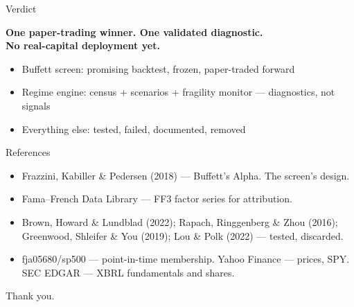 \documentclass[10pt]{beamer}
\begin{document}
\begin{frame}{Verdict}
\begin{center}
\Large\bfseries\color{nmblue} One paper-trading winner. One validated diagnostic.\\ No real-capital deployment yet.
\end{center}
\vspace{1em}
\begin{itemize}
\item Buffett screen: promising backtest, frozen, paper-traded forward
\item Regime engine: census + scenarios + fragility monitor --- diagnostics, not signals
\item Everything else: tested, failed, documented, removed
\end{itemize}
\end{frame}

\begin{frame}{References}
\footnotesize
\begin{itemize}
\item Frazzini, Kabiller \& Pedersen (2018) --- Buffett's Alpha. The screen's design.
\item Fama--French Data Library --- FF3 factor series for attribution.
\item Brown, Howard \& Lundblad (2022); Rapach, Ringgenberg \& Zhou (2016); Greenwood, Shleifer \& You (2019); Lou \& Polk (2022) --- tested, discarded.
\item fja05680/sp500 --- point-in-time membership. Yahoo Finance --- prices, SPY. SEC EDGAR --- XBRL fundamentals and shares.
\end{itemize}
\end{frame}

\begin{frame}
\begin{center}
\Large Thank you.
\end{center}
\end{frame}
\end{document}
